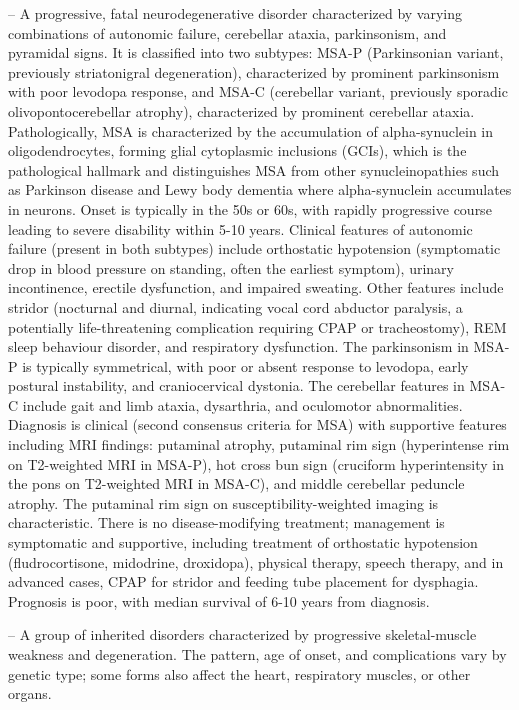-- A progressive, fatal neurodegenerative disorder characterized by varying combinations of autonomic failure, cerebellar ataxia, parkinsonism, and pyramidal signs. It is classified into two subtypes: MSA-P (Parkinsonian variant, previously striatonigral degeneration), characterized by prominent parkinsonism with poor levodopa response, and MSA-C (cerebellar variant, previously sporadic olivopontocerebellar atrophy), characterized by prominent cerebellar ataxia. Pathologically, MSA is characterized by the accumulation of alpha-synuclein in oligodendrocytes, forming glial cytoplasmic inclusions (GCIs), which is the pathological hallmark and distinguishes MSA from other synucleinopathies such as Parkinson disease and Lewy body dementia where alpha-synuclein accumulates in neurons. Onset is typically in the 50s or 60s, with rapidly progressive course leading to severe disability within 5-10 years. Clinical features of autonomic failure (present in both subtypes) include orthostatic hypotension (symptomatic drop in blood pressure on standing, often the earliest symptom), urinary incontinence, erectile dysfunction, and impaired sweating. Other features include stridor (nocturnal and diurnal, indicating vocal cord abductor paralysis, a potentially life-threatening complication requiring CPAP or tracheostomy), REM sleep behaviour disorder, and respiratory dysfunction. The parkinsonism in MSA-P is typically symmetrical, with poor or absent response to levodopa, early postural instability, and craniocervical dystonia. The cerebellar features in MSA-C include gait and limb ataxia, dysarthria, and oculomotor abnormalities. Diagnosis is clinical (second consensus criteria for MSA) with supportive features including MRI findings: putaminal atrophy, putaminal rim sign (hyperintense rim on T2-weighted MRI in MSA-P), hot cross bun sign (cruciform hyperintensity in the pons on T2-weighted MRI in MSA-C), and middle cerebellar peduncle atrophy. The putaminal rim sign on susceptibility-weighted imaging is characteristic. There is no disease-modifying treatment; management is symptomatic and supportive, including treatment of orthostatic hypotension (fludrocortisone, midodrine, droxidopa), physical therapy, speech therapy, and in advanced cases, CPAP for stridor and feeding tube placement for dysphagia. Prognosis is poor, with median survival of 6-10 years from diagnosis.

-- A group of inherited disorders characterized by progressive skeletal-muscle weakness and degeneration. The pattern, age of onset, and complications vary by genetic type; some forms also affect the heart, respiratory muscles, or other organs.

